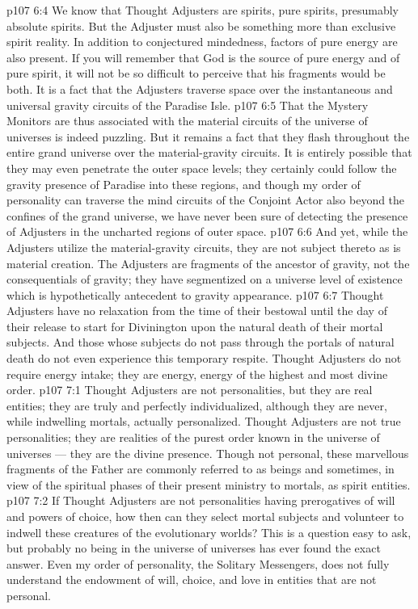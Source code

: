 \vs p107 6:4 \pc We know that Thought Adjusters are spirits, pure spirits, presumably absolute spirits. But the Adjuster must also be something more than exclusive spirit reality. In addition to conjectured mindedness, factors of pure energy are also present. If you will remember that God is the source of pure energy and of pure spirit, it will not be so difficult to perceive that his fragments would be both. It is a fact that the Adjusters traverse space over the instantaneous and universal gravity circuits of the Paradise Isle.
\vs p107 6:5 That the Mystery Monitors are thus associated with the material circuits of the universe of universes is indeed puzzling. But it remains a fact that they flash throughout the entire grand universe over the material\hyp{}gravity circuits. It is entirely possible that they may even penetrate the outer space levels; they certainly could follow the gravity presence of Paradise into these regions, and though my order of personality can traverse the mind circuits of the Conjoint Actor also beyond the confines of the grand universe, we have never been sure of detecting the presence of Adjusters in the uncharted regions of outer space.
\vs p107 6:6 And yet, while the Adjusters utilize the material\hyp{}gravity circuits, they are not subject thereto as is material creation. The Adjusters are fragments of the ancestor of gravity, not the consequentials of gravity; they have segmentized on a universe level of existence which is hypothetically antecedent to gravity appearance.
\vs p107 6:7 Thought Adjusters have no relaxation from the time of their bestowal until the day of their release to start for Divinington upon the natural death of their mortal subjects. And those whose subjects do not pass through the portals of natural death do not even experience this temporary respite. Thought Adjusters do not require energy intake; they are energy, energy of the highest and most divine order.
\vs p107 7:1 Thought Adjusters are not personalities, but they are real entities; they are truly and perfectly individualized, although they are never, while indwelling mortals, actually personalized. Thought Adjusters are not true personalities; they are  realities of the purest order known in the universe of universes --- they are the divine presence. Though not personal, these marvellous fragments of the Father are commonly referred to as beings and sometimes, in view of the spiritual phases of their present ministry to mortals, as spirit entities.
\vs p107 7:2 If Thought Adjusters are not personalities having prerogatives of will and powers of choice, how then can they select mortal subjects and volunteer to indwell these creatures of the evolutionary worlds? This is a question easy to ask, but probably no being in the universe of universes has ever found the exact answer. Even my order of personality, the Solitary Messengers, does not fully understand the endowment of will, choice, and love in entities that are not personal.

